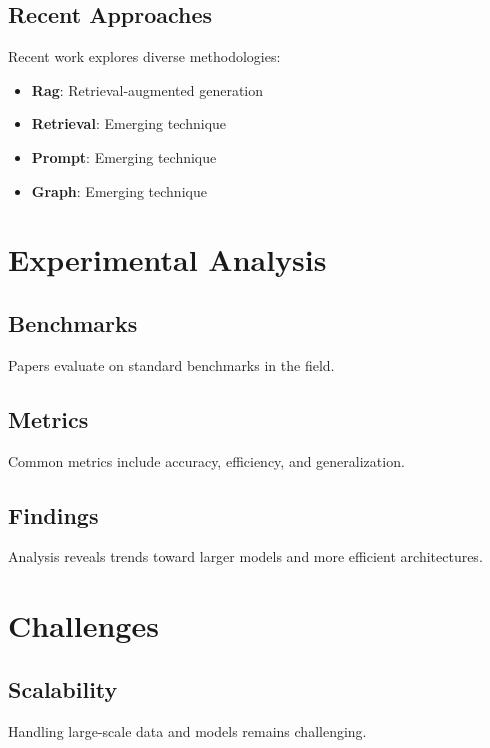 \documentclass[11pt,a4paper]{article}
\begin{document}
\subsection{Recent Approaches}

Recent work explores diverse methodologies:

\begin{itemize}
    \item \textbf{Rag}: Retrieval-augmented generation
    \item \textbf{Retrieval}: Emerging technique
    \item \textbf{Prompt}: Emerging technique
    \item \textbf{Graph}: Emerging technique
\end{itemize}



\section{Experimental Analysis}

\subsection{Benchmarks}

Papers evaluate on standard benchmarks in the field.

\subsection{Metrics}

Common metrics include accuracy, efficiency, and generalization.

\subsection{Findings}

Analysis reveals trends toward larger models and more efficient architectures.



\section{Challenges}

\subsection{Scalability}

Handling large-scale data and models remains challenging.
\end{document}
